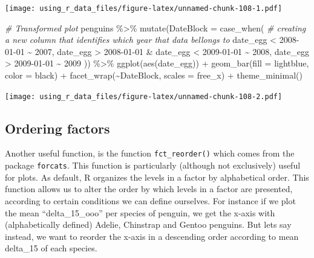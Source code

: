 \documentclass[
]{book}
\newenvironment{Shaded}{\begin{snugshade}}{\end{snugshade}}
\newcommand{\AttributeTok}[1]{\textcolor[rgb]{0.77,0.63,0.00}{#1}}
\newcommand{\CommentTok}[1]{\textcolor[rgb]{0.56,0.35,0.01}{\textit{#1}}}
\newcommand{\FunctionTok}[1]{\textcolor[rgb]{0.00,0.00,0.00}{#1}}
\newcommand{\NormalTok}[1]{#1}
\newcommand{\SpecialCharTok}[1]{\textcolor[rgb]{0.00,0.00,0.00}{#1}}
\newcommand{\StringTok}[1]{\textcolor[rgb]{0.31,0.60,0.02}{#1}}
\begin{document}
\texttt{[image: using\_r\_data\_files/figure-latex/unnamed-chunk-108-1.pdf]}

\begin{Shaded}
\begin{Highlighting}[]
\CommentTok{\# Transformed plot}
\NormalTok{penguins }\SpecialCharTok{\%\textgreater{}\%} 
  \FunctionTok{mutate}\NormalTok{(}\AttributeTok{DateBlock =} \FunctionTok{case\_when}\NormalTok{(  }\CommentTok{\# creating a new column that identifies which year that data bellongs to}
\NormalTok{    date\_egg }\SpecialCharTok{\textless{}} \StringTok{\textquotesingle{}2008{-}01{-}01\textquotesingle{}} \SpecialCharTok{\textasciitilde{}} \StringTok{\textquotesingle{}2007\textquotesingle{}}\NormalTok{,}
\NormalTok{    date\_egg }\SpecialCharTok{\textgreater{}} \StringTok{\textquotesingle{}2008{-}01{-}01\textquotesingle{}} \SpecialCharTok{\&}\NormalTok{ date\_egg }\SpecialCharTok{\textless{}} \StringTok{\textquotesingle{}2009{-}01{-}01\textquotesingle{}} \SpecialCharTok{\textasciitilde{}} \StringTok{\textquotesingle{}2008\textquotesingle{}}\NormalTok{,}
\NormalTok{    date\_egg }\SpecialCharTok{\textgreater{}} \StringTok{\textquotesingle{}2009{-}01{-}01\textquotesingle{}}  \SpecialCharTok{\textasciitilde{}} \StringTok{\textquotesingle{}2009\textquotesingle{}}
\NormalTok{  )) }\SpecialCharTok{\%\textgreater{}\%} 
  \FunctionTok{ggplot}\NormalTok{(}\FunctionTok{aes}\NormalTok{(date\_egg)) }\SpecialCharTok{+}
  \FunctionTok{geom\_bar}\NormalTok{(}\AttributeTok{fill =} \StringTok{\textquotesingle{}lightblue\textquotesingle{}}\NormalTok{, }\AttributeTok{color =} \StringTok{\textquotesingle{}black\textquotesingle{}}\NormalTok{) }\SpecialCharTok{+} 
  \FunctionTok{facet\_wrap}\NormalTok{(}\SpecialCharTok{\textasciitilde{}}\NormalTok{DateBlock, }\AttributeTok{scales =} \StringTok{\textquotesingle{}free\_x\textquotesingle{}}\NormalTok{) }\SpecialCharTok{+}
  \FunctionTok{theme\_minimal}\NormalTok{()}
\end{Highlighting}
\end{Shaded}

\texttt{[image: using\_r\_data\_files/figure-latex/unnamed-chunk-108-2.pdf]}

\hypertarget{ordering-factors}{%
\subsection{Ordering factors}\label{ordering-factors}}

Another useful function, is the function \texttt{fct\_reorder()} which comes from the package \texttt{forcats}.
This function is particularly (although not exclusively) useful for plots.
As default, R organizes the levels in a factor by alphabetical order.
This function allows us to alter the order by which levels in a factor are presented, according to certain conditions we can define ourselves.
For instance if we plot the mean ``delta\_15\_ooo'' per species of penguin, we get the x-axis with (alphabetically defined) Adelie, Chinstrap and Gentoo penguins.
But lets say instead, we want to reorder the x-axis in a descending order according to mean delta\_15 of each species.
\end{document}
